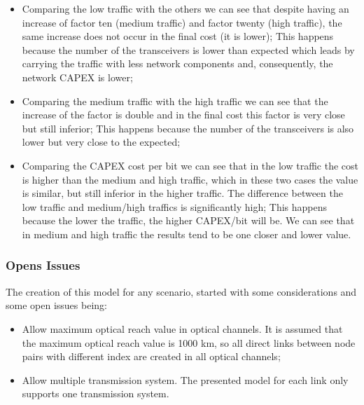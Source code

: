 \begin{itemize}
  \item Comparing the low traffic with the others we can see that despite having an increase of factor ten (medium traffic) and factor twenty (high traffic), the same increase does not occur in the final cost (it is lower);
  \subitem This happens because the number of the transceivers is lower than expected which leads by carrying the traffic with less network components and, consequently, the network CAPEX is lower;
  \item Comparing the medium traffic with the high traffic we can see that the increase of the factor is double and in the final cost this factor is very close but still inferior;
  \subitem This happens because the number of the transceivers is also lower but very close to the expected;
  \item Comparing the CAPEX cost per bit we can see that in the low traffic the cost is higher than the medium and high traffic, which in these two cases the value is similar, but still inferior in the higher traffic. The difference between the low traffic and medium/high traffics is significantly high;
  \subitem This happens because the lower the traffic, the higher CAPEX/bit will be. We can see that in medium and high traffic the results tend to be one closer and lower value.
\end{itemize}

\vspace{13pt}
\subsubsection{Opens Issues}

The creation of this model for any scenario, started with some considerations and some open issues being:

\begin{itemize}
  \item Allow maximum optical reach value in optical channels.
  \subitem It is assumed that the maximum optical reach value is 1000 km, so all direct links between node pairs with different index are created in all optical channels;
  \item Allow multiple transmission system.
  \subitem The presented model for each link only supports one transmission system.
\end{itemize} 